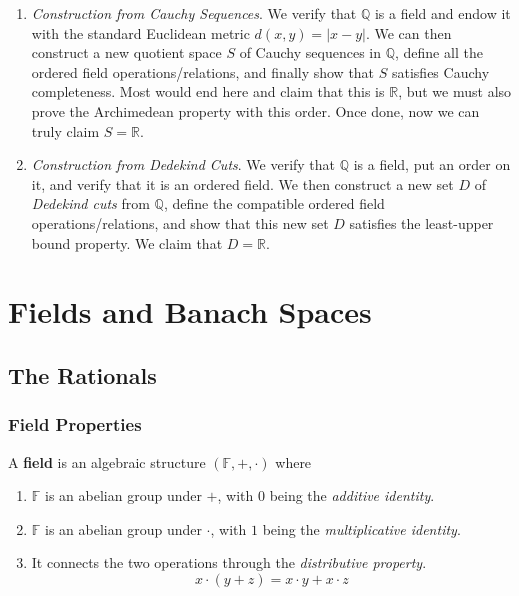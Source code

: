 \documentclass{article}
\begin{document}
  \begin{enumerate}
    \item \textit{Construction from Cauchy Sequences}. We verify that $\mathbb{Q}$ is a field and endow it with the standard Euclidean metric $d(x, y) = |x - y|$. We can then construct a new quotient space $S$ of Cauchy sequences in $\mathbb{Q}$, define all the ordered field operations/relations, and finally show that $S$ satisfies Cauchy completeness. Most would end here and claim that this is $\mathbb{R}$, but we must also prove the Archimedean property with this order. Once done, now we can truly claim $S = \mathbb{R}$. 

    \item \textit{Construction from Dedekind Cuts}. We verify that $\mathbb{Q}$ is a field, put an order on it, and verify that it is an ordered field. We then construct a new set $D$ of \textit{Dedekind cuts} from $\mathbb{Q}$, define the compatible ordered field operations/relations, and show that this new set $D$ satisfies the least-upper bound property. We claim that $D = \mathbb{R}$. 
  \end{enumerate} 

\section{Fields and Banach Spaces} 

  \subsection{The Rationals}

    \subsubsection{Field Properties} 

      \begin{definition}[Field]
        A \textbf{field} is an algebraic structure $(\mathbb{F}, +, \cdot)$ where 
        \begin{enumerate}
          \item $\mathbb{F}$ is an abelian group under $+$, with $0$ being the \textit{additive identity}. 
          \item $\mathbb{F}$ is an abelian group under $\cdot$, with $1$ being the \textit{multiplicative identity}. 
          \item It connects the two operations through the \textit{distributive property}.
          \begin{equation}
            x \cdot (y + z) = x \cdot y + x \cdot z
          \end{equation}
        \end{enumerate}
      \end{definition} 
\end{document}
